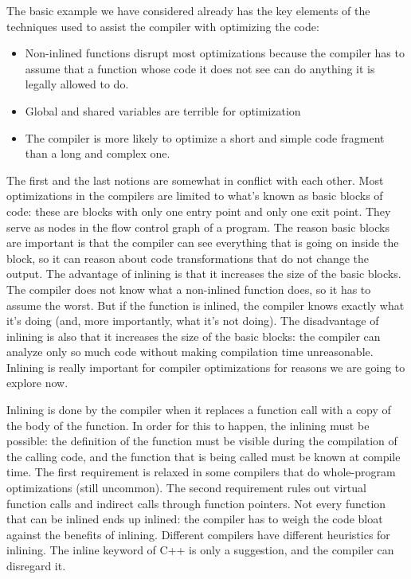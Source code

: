 The basic example we have considered already has the key elements of the techniques used to assist the compiler with optimizing the code:

\begin{itemize}
\item
Non-inlined functions disrupt most optimizations because the compiler has to assume that a function whose code it does not see can do anything it is legally allowed to do. 

\item
Global and shared variables are terrible for optimization

\item
The compiler is more likely to optimize a short and simple code fragment than a long and complex one.
	
\end{itemize}

The first and the last notions are somewhat in conflict with each other. Most optimizations in the compilers are limited to what's known as basic blocks of code: these are blocks with only one entry point and only one exit point. They serve as nodes in the flow control graph of a program. The reason basic blocks are important is that the compiler can see everything that is going on inside the block, so it can reason about code transformations that do not change the output. The advantage of inlining is that it increases the size of the basic blocks. The compiler does not know what a non-inlined function does, so it has to assume the worst. But if the function is inlined, the compiler knows exactly what it's doing (and, more importantly, what it's not doing). The disadvantage of inlining is also that it increases the size of the basic blocks: the compiler can analyze only so much code without making compilation time unreasonable. Inlining is really important for compiler optimizations for reasons we are going to explore now.



Inlining is done by the compiler when it replaces a function call with a copy of the body of the function. In order for this to happen, the inlining must be possible: the definition of the function must be visible during the compilation of the calling code, and the function that is being called must be known at compile time. The first requirement is relaxed in some compilers that do whole-program optimizations (still uncommon). The second requirement rules out virtual function calls and indirect calls through function pointers. Not every function that can be inlined ends up inlined: the compiler has to weigh the code bloat against the benefits of inlining. Different compilers have different heuristics for inlining. The inline keyword of C++ is only a suggestion, and the compiler can disregard it.

